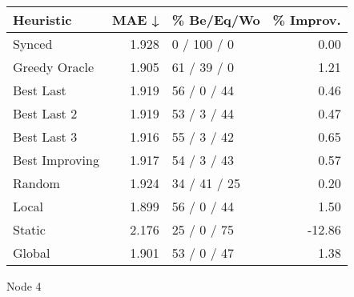 \begin{tabular}{lrlr}
\toprule
\textbf{Heuristic} & \textbf{MAE ↓} & \textbf{\% Be/Eq/Wo} & \textbf{\% Improv.} \\
\midrule
            Synced &          1.928 &          0 / 100 / 0 &                0.00 \\
     Greedy Oracle &          1.905 &          61 / 39 / 0 &                1.21 \\
         Best Last &          1.919 &          56 / 0 / 44 &                0.46 \\
       Best Last 2 &          1.919 &          53 / 3 / 44 &                0.47 \\
       Best Last 3 &          1.916 &          55 / 3 / 42 &                0.65 \\
    Best Improving &          1.917 &          54 / 3 / 43 &                0.57 \\
            Random &          1.924 &         34 / 41 / 25 &                0.20 \\
             Local &          1.899 &          56 / 0 / 44 &                1.50 \\
            Static &          2.176 &          25 / 0 / 75 &              -12.86 \\
            Global &          1.901 &          53 / 0 / 47 &                1.38 \\
\bottomrule
\end{tabular}
\caption{Node 4}
\label{tab:ds_iid_lr01_le1_bs2_4}
